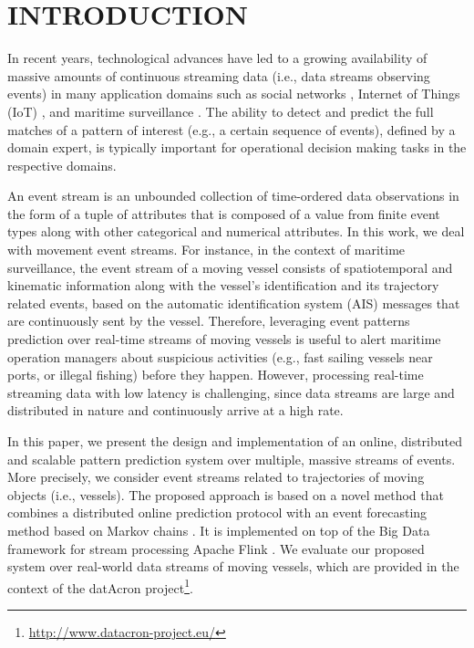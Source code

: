 \chapter{INTRODUCTION}


\par In recent years, technological advances have led to a growing availability of massive amounts of continuous streaming data (i.e., data streams observing events) in many application domains such as social networks \cite{mathioudakis2010twittermonitor}, Internet of Things (IoT) \cite{miorandi2012internet}, and maritime surveillance \cite{patroumpas2015event}.  The ability to detect and predict the full matches of a pattern of interest (e.g., a certain sequence of events), defined by a domain expert, is typically important for operational decision making tasks in the respective domains.

\par An event stream is an unbounded collection of time-ordered data observations in the form of a tuple of attributes that is composed of a value from finite event types along with other categorical and numerical attributes. In this work, we deal with movement event streams. For instance, in the context of maritime surveillance, the event stream of a moving vessel consists of spatiotemporal and kinematic information along with the vessel's identification and its trajectory related events, based on the automatic identification system (AIS) \cite{ais} messages that are continuously sent by the vessel. Therefore, leveraging event patterns prediction over real-time streams of moving vessels is useful to alert maritime operation managers about suspicious activities (e.g., fast sailing vessels near ports, or illegal fishing) before they happen. However, processing real-time streaming data with low latency is challenging, since data streams are large and distributed in nature and continuously arrive at a high rate. 
\par In this paper, we present the design and implementation of an online, distributed and scalable pattern prediction system over multiple, massive streams of events. More precisely, we consider event streams related to trajectories of moving objects (i.e., vessels). The proposed approach is based on a novel method that combines a distributed online prediction protocol \cite{dekel2012optimal,kamp2014communication} with an event forecasting method based on Markov chains \cite{alevizos2017event}. It is implemented on top of the Big Data framework for stream processing Apache Flink \cite{Flink}. We evaluate our proposed system over real-world data streams of moving vessels, which are provided in the context of the datAcron project\footnote{\url{http://www.datacron-project.eu/}}.

